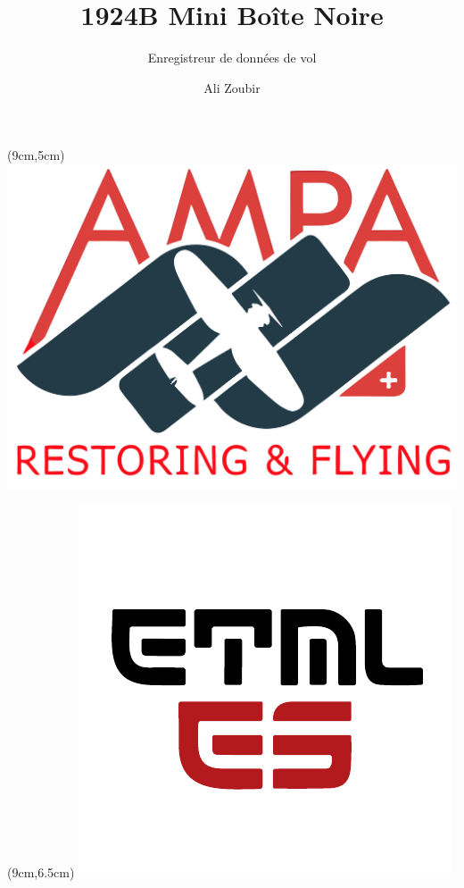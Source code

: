 \documentclass{beamer}
\title{1924B Mini Boîte Noire}
\subtitle{Enregistreur de données de vol}
\author{Ali Zoubir}
\institute{Supérvisé par : Juan José Moreno}
\date{}
\begin{document}
	
\begin{frame}[plain]
	\maketitle
	\begin{textblock*}{2cm}(9cm,5cm) %
		\includegraphics[width=1\linewidth]{../figures/AMPA}
	\end{textblock*}
	\begin{textblock*}{2cm}(9cm,6.5cm) %
		\includegraphics[width=1\linewidth]{../figures/ETML-ES}
	\end{textblock*}
\end{frame}
\end{document}
